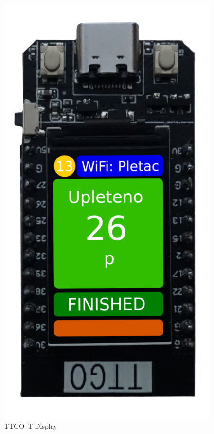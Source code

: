\begin{figure}[htbp]
    \centering
    \includegraphics[width=\textwidth/3 ]{img/ESP32.png}
    \caption{TTGO~T-Display}
    \label{fig:TTGO}
\end{figure}


